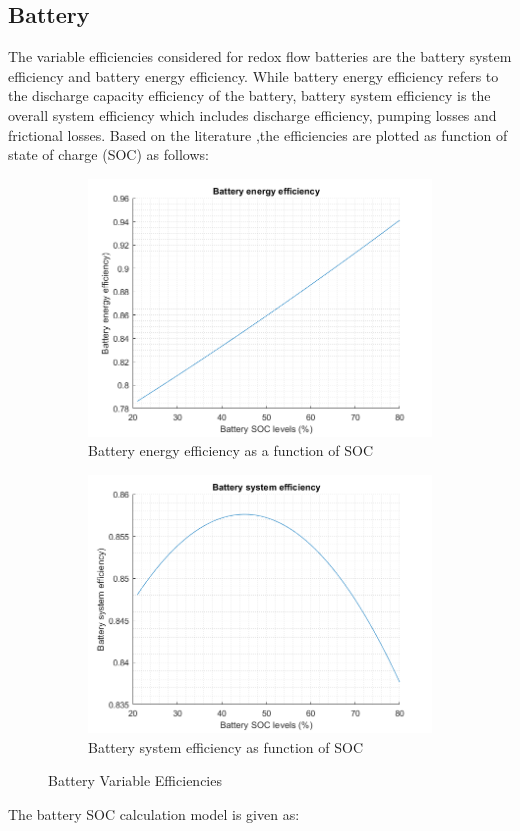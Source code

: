 \subsection{Battery}

The variable efficiencies considered for redox flow batteries are the battery system efficiency and battery energy efficiency. While battery energy efficiency refers to the discharge capacity efficiency of the battery, battery system efficiency is the overall system efficiency which includes discharge efficiency, pumping losses and frictional losses. Based on the literature \citep{bryans_amstutz_girault_berlouis_2018} \citep{7110861},the efficiencies are plotted as function of state of charge (SOC) as follows:

\begin{figure}[H]
\begin{subfigure}{.5\textwidth}
  \centering
  \includegraphics[width=.8\linewidth]{Final_report/Images/battery_energy_efficiency.png}
  \caption{Battery energy efficiency as a function of SOC}
  \label{fig:BatEnergy}
\end{subfigure}
\begin{subfigure}{.5\textwidth}
  \centering
  \includegraphics[width=.8\linewidth]{Final_report/Images/battery_system_efficiency.png}  
  \caption{Battery system efficiency as function of SOC}
  \label{fig:BatSys}
\end{subfigure}
\caption{Battery Variable Efficiencies}
\label{fig:calculation_feed}
\end{figure}
\newline
The battery SOC calculation model is given as:

